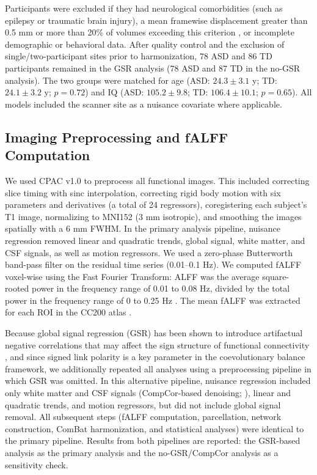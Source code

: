 \documentclass[10pt,letterpaper]{article}
\begin{document}
Participants were excluded if they had neurological comorbidities (such as epilepsy or traumatic
brain injury), a mean framewise displacement greater than 0.5 mm or more than 20\% of volumes
exceeding this criterion \cite{Faul2009}, or incomplete demographic or behavioral data. After
quality control and the exclusion of single/two-participant sites prior to harmonization, 78 ASD
and 86 TD participants remained in the GSR analysis (78 ASD and 87 TD in the no-GSR analysis). The
two groups were matched for age
(ASD: $24.3\pm3.1$ y; TD: $24.1\pm3.2$ y; $p=0.72$) and IQ (ASD: $105.2\pm9.8$; TD:
$106.4\pm10.1$; $p=0.65$). All models included the scanner site as a nuisance covariate where
applicable.

\subsection*{Imaging Preprocessing and fALFF Computation}
We used CPAC v1.0 \cite{Craddock:2013cpac} to preprocess all functional images. This included
correcting slice timing with sinc interpolation, correcting rigid body motion with six parameters
and derivatives (a total of 24 regressors), coregistering each subject's T1 image, normalizing
to MNI152 (3 mm isotropic), and smoothing the images spatially with a 6 mm FWHM. In the primary
analysis pipeline, nuisance regression removed linear and quadratic trends, global signal, white
matter, and CSF signals, as well as motion regressors. We used a zero-phase Butterworth band-pass
filter on the residual time series (0.01--0.1 Hz). We computed fALFF voxel-wise using the Fast
Fourier Transform: ALFF was the average square-rooted power in the frequency range of 0.01 to
0.08 Hz, divided by the total power in the frequency range of 0 to 0.25 Hz
\cite{Zang:2007al,Zou:2008fa}. The mean fALFF was extracted for each ROI in the CC200 atlas
\cite{Craddock:2012atlas}.

Because global signal regression (GSR) has been shown to introduce artifactual negative correlations
that may affect the sign structure of functional connectivity \cite{Murphy2009,Fox2009,Chang2009},
and since signed link polarity is a key parameter in the coevolutionary balance framework, we
additionally repeated all analyses using a preprocessing pipeline in which GSR was omitted. In
this alternative pipeline, nuisance regression included only white matter and CSF signals
(CompCor-based denoising; \cite{Behzadi2007}), linear and quadratic trends, and motion regressors,
but did not include global signal removal. All subsequent steps (fALFF computation, parcellation,
network construction, ComBat harmonization, and statistical analyses) were identical to the primary
pipeline. Results from both pipelines are reported: the GSR-based analysis as the primary analysis
and the no-GSR/CompCor analysis as a sensitivity check.
\end{document}
